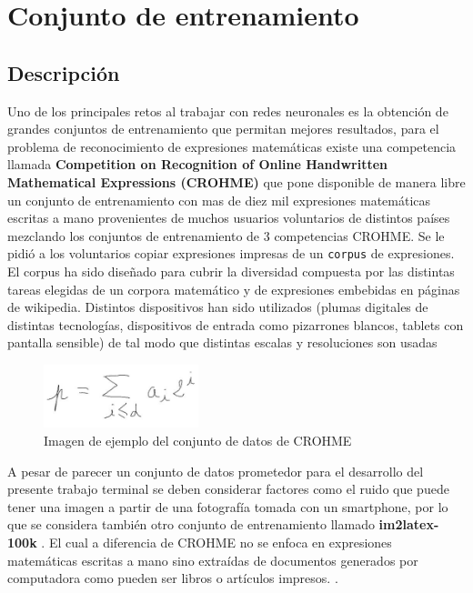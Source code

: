 \section{Conjunto de entrenamiento}
\subsection{Descripción}
Uno de los principales retos al trabajar con redes neuronales es la obtención de grandes conjuntos de entrenamiento que permitan mejores resultados, para el problema de reconocimiento de expresiones matemáticas existe una competencia llamada \textbf{Competition on Recognition of Online Handwritten Mathematical Expressions (CROHME)} que pone disponible de manera libre un conjunto de entrenamiento con mas de diez mil expresiones matemáticas escritas a mano provenientes de muchos usuarios voluntarios de distintos países mezclando los conjuntos de entrenamiento de 3 competencias CROHME. Se le pidió a los voluntarios copiar expresiones impresas de un \texttt{corpus} de expresiones. El corpus ha sido diseñado para cubrir la diversidad compuesta por las distintas tareas elegidas de un corpora matemático y de expresiones embebidas en páginas de wikipedia. Distintos dispositivos han sido utilizados (plumas digitales de distintas tecnologías, dispositivos de entrada como pizarrones blancos, tablets con pantalla sensible) de tal modo que distintas escalas y resoluciones son usadas %

\begin{figure}[h]
	\centering
	\includegraphics[width=0.4\textwidth]{capitulo5/dataset/crohme.jpg}
	\caption{Imagen de ejemplo del conjunto de datos de CROHME}
	\label{fig:crohme}
\end{figure}
\newpage
A pesar de parecer un conjunto de datos prometedor para el desarrollo del presente trabajo terminal se deben considerar factores como el ruido que puede tener una imagen a partir de una fotografía tomada con un smartphone, por lo que se considera también otro conjunto de entrenamiento llamado \textbf{im2latex-100k} \cite{imagetolatex}. El cual a diferencia de CROHME no se enfoca en expresiones matemáticas escritas a mano sino extraídas de documentos generados por computadora como pueden ser libros o artículos impresos. \cite{kanervisto_anssi_2016_56198}.

